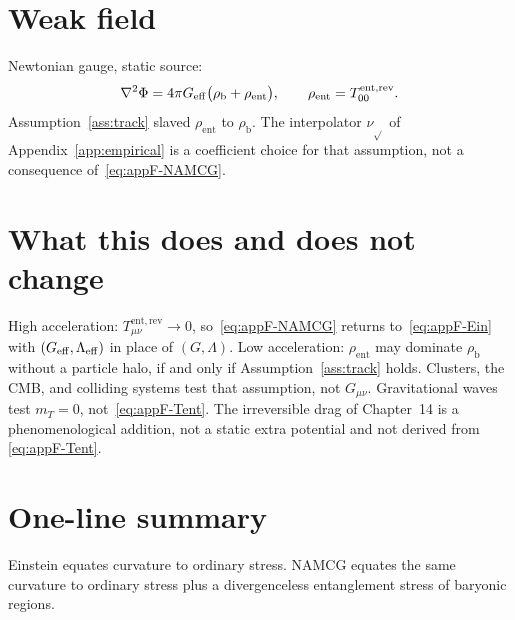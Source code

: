 \section{Weak field}
Newtonian gauge, static source:
\begin{equation}
  \label{eq:appF-Poisson}
  \nabla^2\Phi
  =4\pi G_{\mathrm{eff}}
   \bigl(\rho_{\mathrm{b}}+\rho_{\mathrm{ent}}\bigr),
  \qquad
  \rho_{\mathrm{ent}}
  =T_{00}^{\mathrm{ent,rev}}.
\end{equation}
Assumption~\ref{ass:track} slaved \(\rho_{\mathrm{ent}}\) to
\(\rho_{\mathrm{b}}\). The interpolator \(\nu_{\sqrt{}}\) of
Appendix~\ref{app:empirical} is a coefficient choice for that
assumption, not a consequence of~\eqref{eq:appF-NAMCG}.

\section{What this does and does not change}
High acceleration:
\(T_{\mu\nu}^{\mathrm{ent,rev}}\to 0\), so~\eqref{eq:appF-NAMCG}
returns to~\eqref{eq:appF-Ein} with
\((G_{\mathrm{eff}},\Lambda_{\mathrm{eff}})\) in place of \((G,\Lambda)\).
Low acceleration: \(\rho_{\mathrm{ent}}\) may dominate
\(\rho_{\mathrm{b}}\) without a particle halo, if and only if
Assumption~\ref{ass:track} holds.
Clusters, the CMB, and colliding systems test that assumption,
not \(G_{\mu\nu}\).
Gravitational waves test \(m_T=0\), not~\eqref{eq:appF-Tent}.
The irreversible drag of Chapter~14 is a phenomenological addition,
not a static extra potential and not derived from
\eqref{eq:appF-Tent}.

\section{One-line summary}
Einstein equates curvature to ordinary stress. NAMCG equates
the same curvature to ordinary stress plus a divergenceless
entanglement stress of baryonic regions.